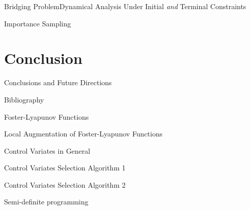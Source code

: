 \documentclass{beamer}
\begin{document}
\begin{frame}{Bridging Problem}{Dynamical Analysis Under Initial \emph{and} Terminal Constraints}
\end{frame}

\begin{frame}{Importance Sampling}
\end{frame}

\section{Conclusion}
\begin{frame}{Conclusions and Future Directions}
\end{frame}

\begin{frame}{Bibliography}
\end{frame}


\begin{frame}{Foster-Lyapunov Functions}
\end{frame}

\begin{frame}{Local Augmentation of Foster-Lyapunov Functions}
\end{frame}

\begin{frame}{Control Variates in General}
\end{frame}

\begin{frame}{Control Variates Selection Algorithm 1}
\end{frame}

\begin{frame}{Control Variates Selection Algorithm 2}
\end{frame}

\begin{frame}{Semi-definite programming}
\end{frame}
\end{document}
